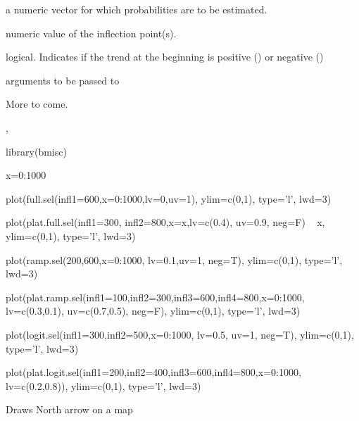 \documentclass[a4paper]{book}
\begin{document}
%
\begin{Arguments}
\begin{ldescription}
\item[\code{x}] a numeric vector for which probabilities are to be estimated.

\item[\code{infl1 to infl4}] numeric value of the inflection point(s).

\item[\code{pos}] logical. Indicates if the trend at the beginning is positive  () or negative ()

\item[\code{...}] arguments to be passed to 

\end{ldescription}
\end{Arguments}
%
\begin{Details}\relax
More to come.
\end{Details}
%
\begin{SeeAlso}\relax
{}, 
\end{SeeAlso}
%
\begin{Examples}
\begin{ExampleCode}

library(bmisc)

x=0:1000

plot(full.sel(infl1=600,x=0:1000,lv=0,uv=1), ylim=c(0,1), type='l', lwd=3)

plot(plat.full.sel(infl1=300, infl2=800,x=x,lv=c(0.4), uv=0.9, neg=F) ~ x, ylim=c(0,1), type='l', lwd=3)

plot(ramp.sel(200,600,x=0:1000, lv=0.1,uv=1, neg=T), ylim=c(0,1), type='l', lwd=3)

plot(plat.ramp.sel(infl1=100,infl2=300,infl3=600,infl4=800,x=0:1000, lv=c(0.3,0.1), uv=c(0.7,0.5), neg=F), ylim=c(0,1), type='l', lwd=3)

plot(logit.sel(infl1=300,infl2=500,x=0:1000, lv=0.5, uv=1, neg=T), ylim=c(0,1), type='l', lwd=3)

plot(plat.logit.sel(infl1=200,infl2=400,infl3=600,infl4=800,x=0:1000, lv=c(0.2,0.8)), ylim=c(0,1), type='l', lwd=3)
\end{ExampleCode}
\end{Examples}
\newpage
{}
%
\begin{Description}\relax
Draws North arrow on a map
\end{Description}
\end{document}
